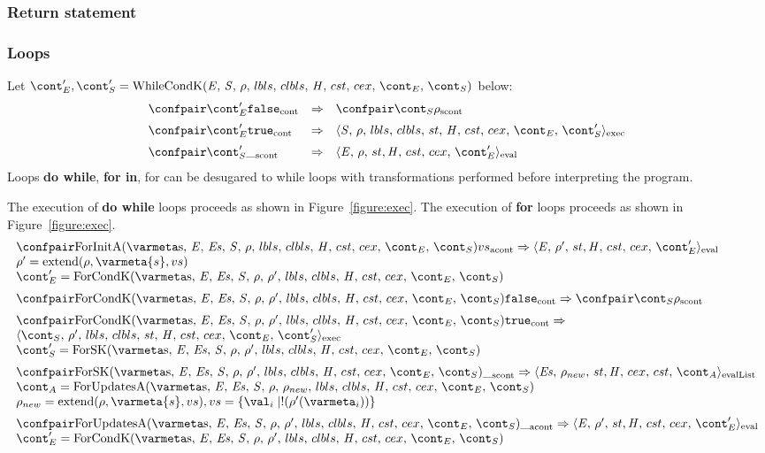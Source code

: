 \documentclass{article}
\DeclareMathOperator{\extend}{extend}
\begin{document}
\subsubsection{Return statement}

\subsubsection{Loops}
Let $\econt', \scont' = \whilecondk$ below:
\[
  \begin{array}{lcl}
	\contconf{\econt'}{\false}
	& \Rightarrow &
	\scontconf{\scont}{\env}\\[2mm]

	\contconf{\econt'}{\true}
	& \Rightarrow &
	\execconf{\stmt}{\env}{\lbls}{\clbls}{\handler}{\cstrace}{\cex}{\econt}{\scont'}\\[2mm]

	\scontconf{\scont'}{\_}
	& \Rightarrow &
	\evalconf{\expr}{\env}{\strace}{\cstrace}{\cex}{\econt'}\\
  \end{array}
\]
Loops \textbf{do while}, \textbf{for in}, for can be desugared to while loops with transformations performed before interpreting the program.

The execution of \textbf{do while} loops proceeds as shown in Figure~\ref{figure:exec}.
The execution of \textbf{for} loops proceeds as shown in Figure~\ref{figure:exec}.
\[
 \begin{array}{l}
	\acontconf{\ForInitA}{\vals}
	\Rightarrow
	\evalconf{\expressionmeta}{\env'}{\strace}{\cstrace}{\cex}{\econt'} \\
	\env' = \extend(\env, \varmeta{s}, \vals) \\
	\econt' = \ForCondK
	\\[2mm]

	\contconf{\ForCondK}{\tt{false}}
	\Rightarrow
	\scontconf{\scont}{\env}
	\\[2mm]

	\contconf{\ForCondK}{\tt{true}}
	\Rightarrow \\
	\execconf{\scont}{\env'}{\lbls}{\clbls}{\handler}{\cstrace}{\cex}{\econt}{\scont'} \\
	\scont' = \ForSK
	\\[2mm]

	\scontconf{\ForSK}{\_}
	\Rightarrow
	\evallistconf{\exprs}{\env_{new}}{st}{cex}{cst}{\acont} \\
	\acont = \ForUpdatesA{\env_{new}} \\
	\env_{new} = \extend(\env, \varmeta{s}, \vals), \vals = \{\val_i \mid \deref(\env'(\varmeta_i))\}
	\\[2mm]

	\acontconf{\ForUpdatesA{\env'}}{\_}
	\Rightarrow
	\evalconf{\expressionmeta}{\env'}{\strace}{\cstrace}{\cex}{\econt'}\\
	\econt' = \ForCondK
 \end{array}
\]
\end{document}
